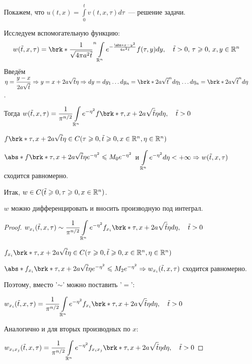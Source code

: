 Покажем, что $u(t,x) = \displaystyle\int\limits_0^t v(t,x,\tau)d\tau$~--- решение задачи.

Исследуем вспомогательную функцию:
\begin{equation*}
	w(\tilde{t}, x, \tau) = \brk*{\dfrac{1}{\sqrt{4\pi a^2\tilde{t}}}}^n \int\limits_{\R^n} e^{-\frac{\abs*{x-y}^2}{4a^2\tilde{t}}} f(\tau,y) dy, \quad \tilde{t} > 0, \, \tau \geqslant 0, \, x, y \in \R^n
\end{equation*}
Введём $\eta = \dfrac{y-x}{2a\sqrt{\tilde{t}}} \Rightarrow y = x + 2a\sqrt{\tilde{t}} \eta \Rightarrow dy = dy_1\ldots dy_n = \brk*{2a\sqrt{\tilde{t}}}^n d\eta_1\ldots d\eta_n = \brk*{2a\sqrt{\tilde{t}}}^n d\eta$.

Тогда $w(\tilde{t}, x, \tau) = \dfrac{1}{\pi^{n/2}} \displaystyle\int\limits_{\R^n} e^{-\eta^2} f\brk*{\tau, x+2a\sqrt{\tilde{t}}\eta}d\eta, \quad \tilde{t} > 0$

$f\brk*{\tau, x+2a\sqrt{\tilde{t}}\eta} \in C(\tau \geqslant 0, \tilde{t} \geqslant 0, x \in \R^n, \eta \in \R^n)$

$\abs*{f\brk*{\tau, x+2a\sqrt{\tilde{t}}\eta}e^{-\eta^2}} \leqslant M_0 e^{-\eta^2}$ и $\displaystyle\int\limits_{\mathbb{R}^n} e^{-\eta^2}d\eta <+\infty \Rightarrow w(\tilde{t}, x, \tau)$ сходится равномерно.

Итак, $w \in C(\tilde{t} \geqslant 0, \tau \geqslant 0, x \in \mathbb{R}^n)$.

\begin{statement}
	$w$ можно дифференцировать и вносить производную под интеграл.
\end{statement}

\begin{proof}
	$w_{x_i}(\tilde{t}, x, \tau) \sim \dfrac{1}{\pi^{n/2}} \displaystyle\int\limits_{\R^n} e^{-\eta^2} f_{x_i}\brk*{\tau, x+2a\sqrt{\tilde{t}}\eta}d\eta, \quad \tilde{t} > 0$

	$f_{x_i}\brk*{\tau, x+2a\sqrt{\tilde{t}}\eta} \in C(\tau \geqslant 0, \tilde{t} \geqslant 0, x \in \R^n, \eta \in \R^n)$

	$\abs*{f_{x_i}\brk*{\tau, x+2a\sqrt{\tilde{t}}\eta}e^{-\eta^2}} \leqslant M_2 e^{-\eta^2} \Rightarrow w_{x_i}(\tilde{t}, x, \tau)$ сходится равномерно.

	Поэтому, вместо '$\sim$' можно поставить '$=$':

	$w_{x_i}(\tilde{t}, x, \tau) = \dfrac{1}{\pi^{n/2}} \displaystyle\int\limits_{\R^n} e^{-\eta^2} f_{x_i}\brk*{\tau, x+2a\sqrt{\tilde{t}}\eta}d\eta, \quad \tilde{t} > 0$

	Аналогично и для вторых производных по $x$:

	$w_{x_ix_j}(\tilde{t}, x, \tau) = \dfrac{1}{\pi^{n/2}} \displaystyle\int\limits_{\R^n} e^{-\eta^2} f_{x_ix_j}\brk*{\tau, x+2a\sqrt{\tilde{t}}\eta} d\eta, \quad \tilde{t} > 0$
\end{proof}
	
